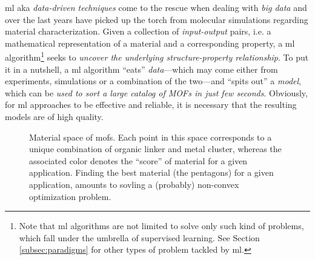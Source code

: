 \Gls{ml} aka \emph{data-driven
techniques} come to the rescue when dealing with \emph{big data}
and over the last years have picked up the torch from molecular simulations
regarding material characterization. Given a collection of
\emph{input-output} pairs, i.e. a mathematical
representation of a material and a corresponding property, a \gls{ml}
algorithm\footnote{Note that \gls{ml}
algorithms are not limited to solve only such kind of problems, which fall under
the umbrella of supervised learning. See Section
\ref{subsec:paradigms} for other types of problem tackled by \gls{ml}.} seeks to
\emph{uncover the underlying structure-property relationship}. To put it in a
nutshell, a \gls{ml} algorithm ``eats'' \emph{data}---which may come
either from experiments, simulations or a combination of the two---and ``spits
out'' a \emph{model}, which can be \emph{used to sort a large
catalog of MOFs in just few seconds}. Obviously, for \gls{ml} approaches to be
effective and reliable, it is necessary that the resulting models are of high
quality.

\begin{figure}
	\centering
	\caption[Material space of .]{Material space of \glspl{mof}. Each point in this space corresponds to a unique
	combination of organic linker and metal cluster, whereas the associated
	color denotes the ``score'' of material for a given application. Finding the
	best material (the pentagons) for a given application, amounts to sovling a
	(probably) non-convex optimization problem.}
	\label{fig:mofs_space}
\end{figure}

